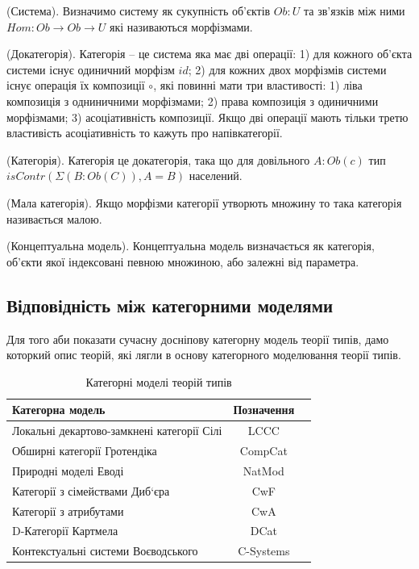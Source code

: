 \begin{definition} (Система).
Визначимо систему як сукупність об'єктів $Ob : U$
та зв'язків між ними $Hom : Ob \rightarrow Ob \rightarrow U$ які називаються морфізмами.
\end{definition}

\begin{definition} (Докатегорія).
Категорія -- це система яка має дві операції:
1) для кожного об'єкта системи існує одиничний морфізм $id$;
2) для кожних двох морфізмів системи існує операція їх композиції $\circ$,
які повинні мати три властивості:
1) ліва композиція з одниничними морфізмами;
2) права композиція з одиничними морфізмами;
3) асоціативність композиції. Якщо дві операції
мають тільки третю властивість асоціативність то кажуть про напівкатегорії.
\end{definition}

\begin{definition} (Категорія).
Категорія це докатегорія, така що для довільного $A: Ob(c)$
тип $isContr(\Sigma(B:Ob(C)),A=B)$ населений.
\end{definition}

\begin{definition} (Мала категорія).
Якщо морфізми категорії утворють множину то така категорія називається малою.
\end{definition}

\begin{definition} (Концептуальна модель).
Концептуальна модель визначається як категорія, об'єкти якої індексовані певною множиною, або залежні від параметра.
\end{definition}


\subsection{Відповідність між категорними моделями}
Для того аби показати сучасну досніпову категорну модель теорії типів,
дамо которкий опис теорій, які лягли в основу категорного моделювання теорії типів.

\begin{table}[ht]
 \caption{Категорні моделі теорій типів}
  \begin{tabular}{lcc}
    \hline
       \textbf{Категорна модель} & \textbf{Позначення} \\
    \hline
 Локальні декартово-замкнені категорії Сілі & LCCC \\
 Обширні категорії Гротендіка               & CompCat \\
 Природні моделі Еводі                      & NatMod \\
 Категорії з сімействами Диб`єра            & CwF \\
 Категорії з атрибутами                     & CwA \\
 D-Категорії Картмела                       & DCat \\
 Контекстуальні системи Воєводського        & C-Systems \\
    \hline
  \end{tabular}
\end{table}

